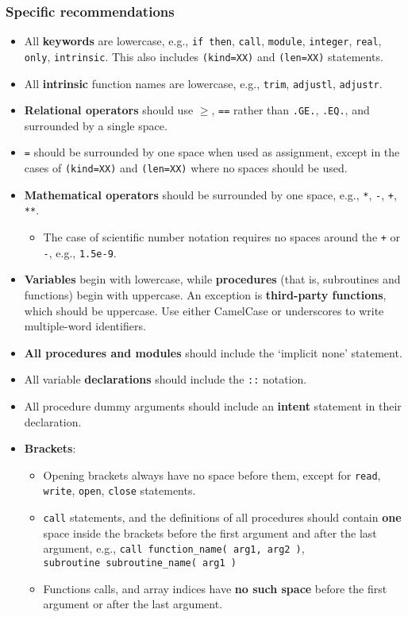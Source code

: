 \subsubsection{Specific recommendations}

\begin{itemize}
\item All \textbf{keywords} are lowercase, e.g., \texttt{if\ then},
  \texttt{call}, \texttt{module}, \texttt{integer}, \texttt{real},
  \texttt{only}, \texttt{intrinsic}. This also includes
  \texttt{(kind=XX)} and \texttt{(len=XX)} statements.
\item All \textbf{intrinsic} function names are lowercase, e.g.,
  \texttt{trim}, \texttt{adjustl}, \texttt{adjustr}.
\item \textbf{Relational operators} should use
  \texttt{$\geq$}, \texttt{==} rather than \texttt{.GE.},
  \texttt{.EQ.}, and surrounded by a single space.
\item \texttt{=} should be surrounded by one space when used as
  assignment, except in the cases of \texttt{(kind=XX)} and
  \texttt{(len=XX)} where no spaces should be used.
\item \textbf{Mathematical operators} should be surrounded by one
  space, e.g., \texttt{*}, \texttt{-}, \texttt{+}, \texttt{**}.
  \begin{itemize}
  \item The case of scientific number notation requires no spaces
    around the \texttt{+} or \texttt{-}, e.g., \texttt{1.5e-9}.
  \end{itemize}
\item \textbf{Variables} begin with lowercase, while
  \textbf{procedures} (that is, subroutines and functions) begin with
  uppercase. An exception is \textbf{third-party functions}, which
  should be uppercase. Use either CamelCase or underscores to write
  multiple-word identifiers.
\item \textbf{All procedures and modules} should include the `implicit
  none' statement.
\item All variable \textbf{declarations} should include the
  \texttt{::} notation.
\item All procedure dummy arguments should include an \textbf{intent}
  statement in their declaration.
\item \textbf{Brackets}:
  \begin{itemize}
  \item Opening brackets always have no space before them, except for
    \texttt{read}, \texttt{write}, \texttt{open}, \texttt{close}
    statements.
  \item \texttt{call} statements, and the definitions of all
    procedures should contain \textbf{one} space inside the brackets
    before the first argument and after the last argument, e.g.,
    \texttt{call\ function\_name(\ arg1,\ arg2\ )},
    \texttt{subroutine\ subroutine\_name(\ arg1\ )}
  \item Functions calls, and array indices have \textbf{no such space}
    before the first argument or after the last argument.
  \end{itemize}
\end{itemize}
